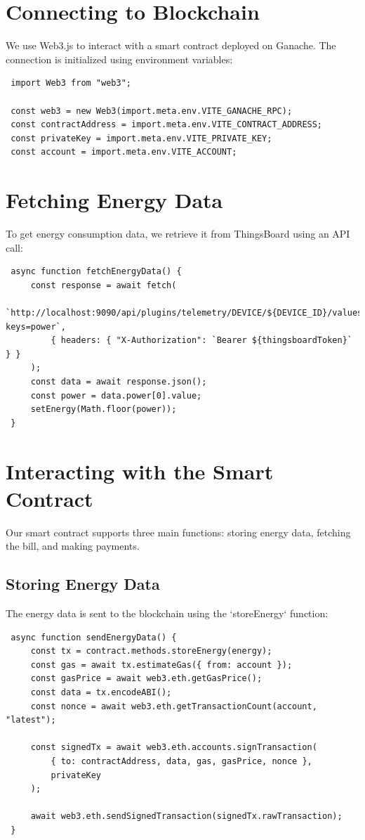 \documentclass[a4paper,12pt]{report}
\begin{document}
 \section{Connecting to Blockchain}
 We use Web3.js to interact with a smart contract deployed on Ganache. The connection is initialized using environment variables:
 
 \begin{lstlisting}
 import Web3 from "web3";
 
 const web3 = new Web3(import.meta.env.VITE_GANACHE_RPC);
 const contractAddress = import.meta.env.VITE_CONTRACT_ADDRESS;
 const privateKey = import.meta.env.VITE_PRIVATE_KEY;
 const account = import.meta.env.VITE_ACCOUNT;
 \end{lstlisting}
 
 \section{Fetching Energy Data}
 To get energy consumption data, we retrieve it from ThingsBoard using an API call:
 
 \begin{lstlisting}
 async function fetchEnergyData() {
     const response = await fetch(
         `http://localhost:9090/api/plugins/telemetry/DEVICE/${DEVICE_ID}/values/timeseries?keys=power`,
         { headers: { "X-Authorization": `Bearer ${thingsboardToken}` } }
     );
     const data = await response.json();
     const power = data.power[0].value;
     setEnergy(Math.floor(power));
 }
 \end{lstlisting}
 
 \section{Interacting with the Smart Contract}
 Our smart contract supports three main functions: storing energy data, fetching the bill, and making payments.
 
 \subsection{Storing Energy Data}
 The energy data is sent to the blockchain using the `storeEnergy` function:
 
 \begin{lstlisting}
 async function sendEnergyData() {
     const tx = contract.methods.storeEnergy(energy);
     const gas = await tx.estimateGas({ from: account });
     const gasPrice = await web3.eth.getGasPrice();
     const data = tx.encodeABI();
     const nonce = await web3.eth.getTransactionCount(account, "latest");
 
     const signedTx = await web3.eth.accounts.signTransaction(
         { to: contractAddress, data, gas, gasPrice, nonce },
         privateKey
     );
 
     await web3.eth.sendSignedTransaction(signedTx.rawTransaction);
 }
 \end{lstlisting}
 
\end{document}
